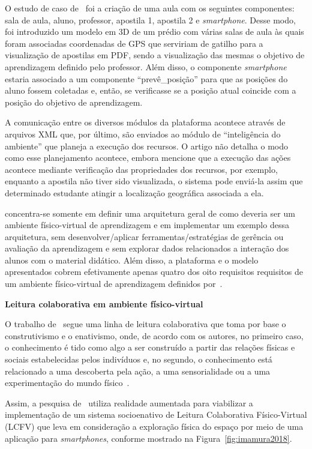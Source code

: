 O estudo de caso de~\cite{Santos:2014} foi a criação de uma aula com os seguintes componentes: sala de aula, aluno, professor, apostila 1, apostila 2 e \textit{smartphone}. Desse modo, foi introduzido um modelo em 3D de um prédio com várias salas de aula às quais foram associadas coordenadas de GPS que serviriam de gatilho para a visualização de apostilas em PDF, sendo a visualização das mesmas o objetivo de aprendizagem definido pelo professor. Além disso, o componente \textit{smartphone} estaria associado a um componente ``prevê\_posição'' para que as posições do aluno fossem coletadas e, então, se verificasse se a posição atual coincide com a posição do objetivo de aprendizagem.

A comunicação entre os diversos módulos da plataforma acontece através de arquivos XML que, por último, são enviados ao módulo de ``inteligência do ambiente'' que planeja a execução dos recursos. O artigo não detalha o modo como esse planejamento acontece, embora mencione que a execução das ações acontece mediante verificação das propriedades dos recursos, por exemplo, enquanto a apostila não tiver sido visualizada, o sistema pode enviá-la assim que determinado estudante atingir a localização geográfica associada a ela.

\cite{Santos:2014} concentra-se somente em definir uma arquitetura geral de como deveria ser um ambiente físico-virtual de aprendizagem e em implementar um exemplo dessa arquitetura, sem desenvolver/aplicar ferramentas/estratégias de gerência ou avaliação da aprendizagem e sem explorar dados relacionados a interação dos alunos com o material didático. Além disso, a plataforma e o modelo apresentados cobrem efetivamente apenas quatro dos oito requisitos requisitos de um ambiente físico-virtual de aprendizagem definidos por~\cite{santos:2014ambientes}.

\textbf{Leitura colaborativa em ambiente físico-virtual}

O trabalho de~\cite{imamura:2018} segue uma linha de leitura colaborativa que toma por base o construtivismo e o enativismo, onde, de acordo com os autores, no primeiro caso, o conhecimento é tido como algo a ser construído a partir das relações físicas e sociais estabelecidas pelos indivíduos e, no segundo, o conhecimento está relacionado a uma descoberta pela ação, a uma sensorialidade ou a uma experimentação do mundo físico~\citep{imamura:2018}. 

Assim, a pesquisa de~\cite{imamura:2018} utiliza realidade aumentada para viabilizar a implementação de um sistema socioenativo de Leitura Colaborativa Físico-Virtual (LCFV) que leva em consideração a exploração física do espaço por meio de uma aplicação para \textit{smartphones}, conforme mostrado na Figura~\ref{fig:imamura2018}.

